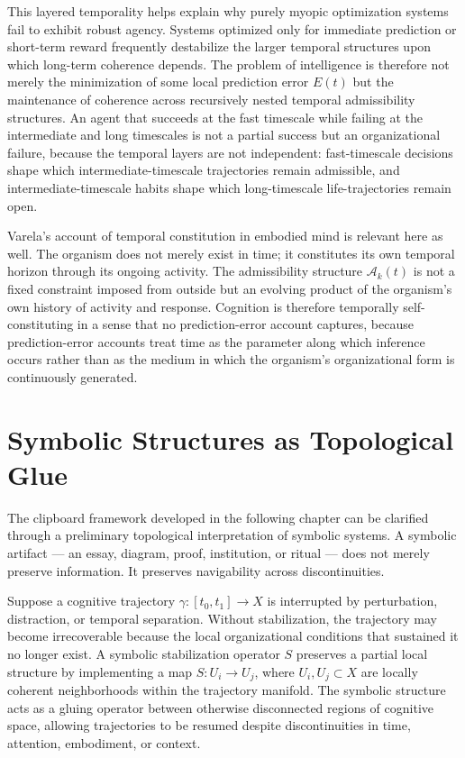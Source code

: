 \documentclass[12pt,a4paper]{report}
\theoremstyle{flyxion}
\begin{document}
This layered temporality helps explain why purely myopic optimization systems fail to exhibit robust agency. Systems optimized only for immediate prediction or short-term reward frequently destabilize the larger temporal structures upon which long-term coherence depends. The problem of intelligence is therefore not merely the minimization of some local prediction error $E(t)$ but the maintenance of coherence across recursively nested temporal admissibility structures. An agent that succeeds at the fast timescale while failing at the intermediate and long timescales is not a partial success but an organizational failure, because the temporal layers are not independent: fast-timescale decisions shape which intermediate-timescale trajectories remain admissible, and intermediate-timescale habits shape which long-timescale life-trajectories remain open.

Varela's account of temporal constitution in embodied mind \cite{varela} is relevant here as well. The organism does not merely exist in time; it constitutes its own temporal horizon through its ongoing activity. The admissibility structure $\mathcal{A}_k(t)$ is not a fixed constraint imposed from outside but an evolving product of the organism's own history of activity and response. Cognition is therefore temporally self-constituting in a sense that no prediction-error account captures, because prediction-error accounts treat time as the parameter along which inference occurs rather than as the medium in which the organism's organizational form is continuously generated.

\section{Symbolic Structures as Topological Glue}

The clipboard framework developed in the following chapter can be clarified through a preliminary topological interpretation of symbolic systems. A symbolic artifact --- an essay, diagram, proof, institution, or ritual --- does not merely preserve information. It preserves navigability across discontinuities.

Suppose a cognitive trajectory $\gamma : [t_0, t_1] \rightarrow X$ is interrupted by perturbation, distraction, or temporal separation. Without stabilization, the trajectory may become irrecoverable because the local organizational conditions that sustained it no longer exist. A symbolic stabilization operator $S$ preserves a partial local structure by implementing a map $S : U_i \rightarrow U_j$, where $U_i, U_j \subset X$ are locally coherent neighborhoods within the trajectory manifold. The symbolic structure acts as a gluing operator between otherwise disconnected regions of cognitive space, allowing trajectories to be resumed despite discontinuities in time, attention, embodiment, or context.
\end{document}
